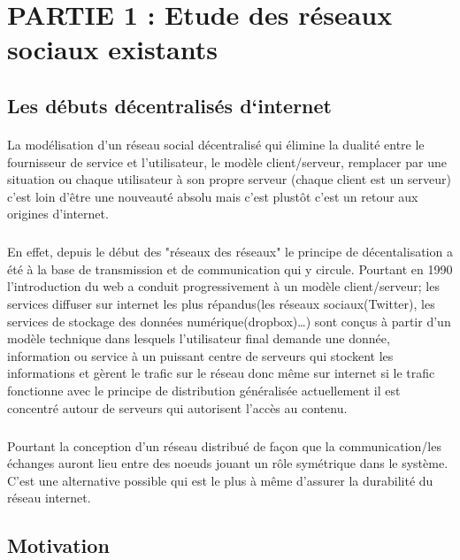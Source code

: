 \newpage
\section{PARTIE 1 : Etude des réseaux sociaux existants}
\subsection{Les débuts décentralisés d‘internet} 
\paragraph{}
La modélisation d'un réseau social décentralisé qui élimine la dualité entre le fournisseur de service et l'utilisateur, le modèle client/serveur, remplacer par une situation ou chaque utilisateur à son propre serveur (chaque client est un serveur) c'est loin d'être une nouveauté absolu mais c'est plustôt c'est un retour aux origines d'internet.
\subparagraph{} 
En effet, depuis le début des "réseaux des réseaux" le principe de décentalisation a été à la base de transmission et de communication qui y circule.  Pourtant en 1990 l'introduction du web a conduit progressivement à un modèle client/serveur;  les services diffuser sur internet les plus répandus(les réseaux sociaux(Twitter), les services de stockage des données numérique(dropbox)…)
sont conçus à partir d'un modèle technique dans lesquels l'utilisateur final demande une donnée, information ou service à un puissant centre de serveurs qui stockent les informations et gèrent le trafic sur le réseau donc même sur internet si le trafic fonctionne avec le principe de distribution généralisée actuellement il est concentré autour de serveurs qui autorisent l'accès au contenu.
\subparagraph{}
Pourtant la conception d'un réseau distribué de façon que la communication/les échanges auront lieu entre des noeuds jouant un rôle symétrique dans le système. C'est une alternative possible qui est le plus à même d'assurer la durabilité du réseau internet.
\subsection{Motivation} 
